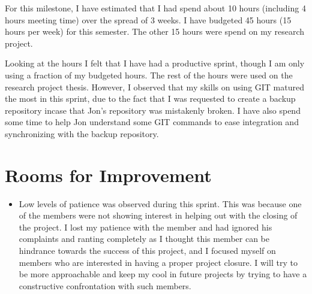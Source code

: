For this milestone, I have estimated that I had spend about 10 hours (including 4 hours meeting time) over the spread of 3 weeks. I have budgeted 45 hours (15 hours per week) for this semester. The other 15 hours were spend on my research project. 

Looking at the hours I felt that I have had a productive sprint, though I am only using a fraction of my budgeted hours. The rest of the hours were used on the research project thesis. However, I observed that my skills on using GIT matured the most in this sprint, due to the fact that I was requested to create a backup repository incase that Jon's repository was mistakenly broken. I have also spend some time to help Jon understand some GIT commands to ease integration and synchronizing with the backup repository. 

\section*{Rooms for Improvement}

\begin{itemize}
   \item Low levels of patience was observed during this sprint. This was because one of the members were not showing interest in helping out with the closing of the project. I lost my patience with the member and had ignored his complaints and ranting completely as I thought this member can be hindrance towards the success of this project, and I focused myself on members who are interested in having a proper project closure. I will try to be more approachable and keep my cool in future projects by trying to have a constructive confrontation with such members. 
\end{itemize}
